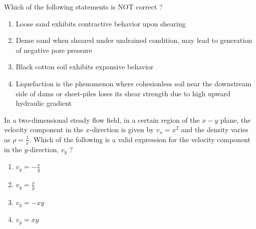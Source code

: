 \item Which of the following statements is NOT correct ?
\begin{enumerate}
    \item Loose sand exhibits contractive behavior upon shearing
    \item Dense sand when sheared under undrained condition, may lead to generation of negative pore pressure
    \item Black cotton soil exhibits expansive behavior
    \item Liquefaction is the phenomenon where cohesionless soil near the downstream side of dams or sheet-piles loses its shear strength due to high upward hydraulic gradient \\
\end{enumerate}
\item In a two-dimensional steady flow field, in a certain region of the $x-y$ plane, the velocity component in the $x$-direction is given by $v_x = x^2$ and the density varies as $\rho = \frac{1}{x}$. Which of the following is a valid expression for the velocity component in the $y$-direction, $v_y$ ?
\begin{enumerate}
    \item $v_y = -\frac{x}{y}$
    \item $v_y = \frac{x}{y}$
    \item $v_y = -xy$
    \item $v_y = xy$ \\
\end{enumerate}

